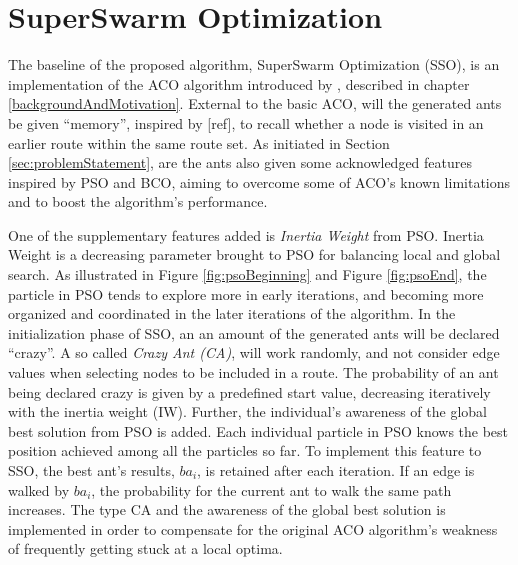 \section{SuperSwarm Optimization}

The baseline of the proposed algorithm, SuperSwarm Optimization (SSO), is an implementation of the ACO algorithm introduced by \citet{nanda11}, described in chapter \vref{backgroundAndMotivation}. External to the basic ACO, will the generated ants be given ``memory'', inspired by [ref], to recall whether a node is visited in an earlier route within the same route set. As initiated in Section \vref{sec:problemStatement}, are the ants also given some acknowledged features inspired by PSO and BCO, aiming to overcome some of ACO's known limitations and to boost the algorithm's performance. 

One of the supplementary features added is \textit{Inertia Weight} from PSO. Inertia Weight is a decreasing parameter brought to PSO for balancing local and global search. As illustrated in Figure \vref{fig:psoBeginning} and Figure \vref{fig:psoEnd}, the particle in PSO tends to explore more in early iterations, and becoming more organized and coordinated in the later iterations of the algorithm. In the initialization phase of SSO, an an amount of the generated ants will be declared ``crazy''. A so called \textit{Crazy Ant (CA)}, will work randomly, and not consider edge values when selecting nodes to be included in a route. The probability of an ant being declared crazy is given by a predefined start value, decreasing iteratively with the inertia weight (IW). %
Further, the individual's awareness of the global best solution from PSO is added. Each individual particle in PSO knows the best position achieved among all the particles so far. To implement this feature to SSO, the best ant's results, $ba_i$, is retained after each iteration. If an edge is walked by $ba_i$, the probability for the current ant to walk the same path increases. The type CA and the awareness of the global best solution is implemented in order to compensate for the original ACO algorithm's weakness of frequently getting stuck at a local optima. %

